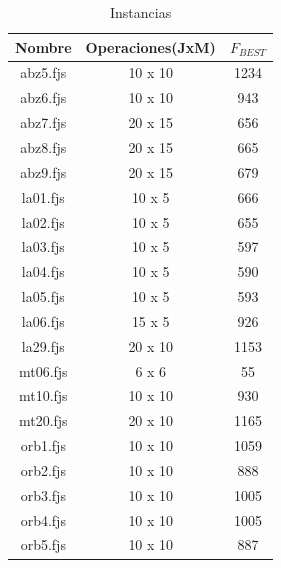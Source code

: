 \documentclass[journal]{IEEEtran}
\begin{document}
\begin{table}

\begin{center}
    \begin{tabular}{| c | c | c |}
    \hline
    \textbf{Nombre} & \textbf{Operaciones(JxM)} & \textbf{$F_{BEST}$} \\ \hline
    abz5.fjs & 10 x 10  & 1234  \\ \hline
    abz6.fjs & 10 x 10  & 943   \\ \hline
    abz7.fjs & 20 x 15  & 656   \\ \hline
    abz8.fjs & 20 x 15  & 665   \\ \hline
    abz9.fjs & 20 x 15  & 679   \\ \hline
    la01.fjs & 10 x 5   & 666   \\ \hline
    la02.fjs & 10 x 5   & 655   \\ \hline
    la03.fjs & 10 x 5   & 597   \\ \hline
    la04.fjs & 10 x 5   & 590   \\ \hline
    la05.fjs & 10 x 5   & 593   \\ \hline
    la06.fjs & 15 x 5   & 926   \\ \hline
    la29.fjs & 20 x 10  & 1153  \\ \hline
    mt06.fjs & 6 x 6    & 55    \\ \hline
    mt10.fjs & 10 x 10  & 930   \\ \hline
    mt20.fjs & 20 x 10  & 1165  \\ \hline
    orb1.fjs & 10 x 10  & 1059  \\ \hline
    orb2.fjs & 10 x 10  & 888   \\ \hline
    orb3.fjs & 10 x 10  & 1005  \\ \hline
    orb4.fjs & 10 x 10  & 1005  \\ \hline
    orb5.fjs & 10 x 10  & 887   \\ \hline
    \end{tabular}
\end{center}
    \caption{Instancias}
    \label{tabla:instancias}
\end{table}
\end{document}
